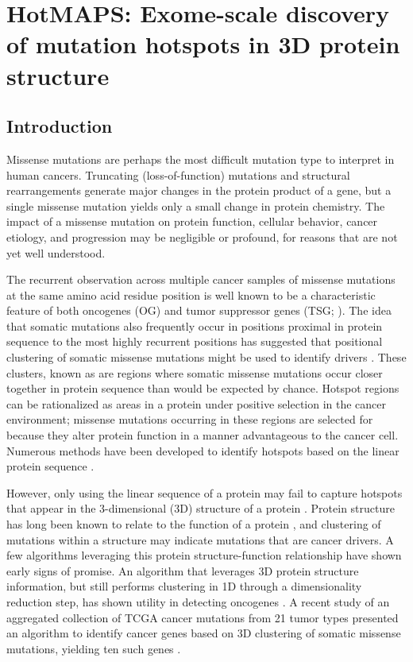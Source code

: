 
\chapter{HotMAPS: Exome-scale discovery of mutation hotspots in 3D protein structure}
\label{chap:ch5}

\section{Introduction}

Missense mutations are perhaps the most difficult mutation type to interpret in human cancers. Truncating (loss-of-function) mutations and structural rearrangements generate major changes in the protein product of a gene, but a single missense mutation yields only a small change in protein chemistry. The impact of a missense mutation on protein function, cellular behavior, cancer etiology, and progression may be negligible or profound, for reasons that are not yet well understood. 

The recurrent observation across multiple cancer samples of missense mutations at the same amino acid residue position is well known to be a characteristic feature of both oncogenes (OG) and tumor suppressor genes (TSG; \cite{RN107}). The idea that somatic mutations also frequently occur in positions proximal in protein sequence to the most highly recurrent positions has suggested that positional clustering of somatic missense mutations might be used to identify drivers \cite{RN109}. These clusters, known as  are regions where somatic missense mutations occur closer together in protein sequence than would be expected by chance. Hotspot regions can be rationalized as areas in a protein under positive selection in the cancer environment; missense mutations occurring in these regions are selected for because they alter protein function in a manner advantageous to the cancer cell. Numerous methods have been developed to identify hotspots based on the linear protein sequence \cite{RN16, RN46, RN110, RN87, RN54, RN55}.

However, only using the linear sequence of a protein may fail to capture hotspots that appear in the 3-dimensional (3D) structure of a protein \cite{RN105}. Protein structure has long been known to relate to the function of a protein \cite{RN112, RN113}, and clustering of mutations within a structure may indicate mutations that are cancer drivers. A few algorithms leveraging this protein structure-function relationship have shown early signs of promise. An algorithm that leverages 3D protein structure information, but still performs clustering in 1D through a dimensionality reduction step, has shown utility in detecting oncogenes \cite{RN15}. A recent study of an aggregated collection of TCGA cancer mutations from 21 tumor types presented an algorithm to identify cancer genes based on 3D clustering of somatic missense mutations, yielding ten such genes \cite{RN105}. 

